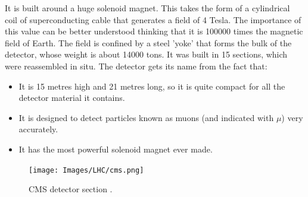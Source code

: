 It is built around a huge solenoid magnet. This takes the form of a cylindrical coil of superconducting cable that generates a field of 4 Tesla. The importance of this value can be better understood thinking that it is 100000 times the magnetic field of Earth. The field is confined by a steel 'yoke' that forms the bulk of the detector, whose weight is about 14000 tons. It was built in 15 sections, which were reassembled in situ. The detector gets its name from the fact that:
\begin{itemize}
	\item It is 15 metres high and 21 metres long, so it is quite compact for all the detector material it contains.
	\item It is designed to detect particles known as muons (and indicated with $\mu$) very accurately.
	\item It has the most powerful solenoid magnet ever made.
\end{itemize}

\begin{figure}[t]
	\begin{center}
		\texttt{[image: Images/LHC/cms.png]}
		\caption{CMS detector section \cite{cms}.}
		\label{fig:CMS_SECTION}
	\end{center}
\end{figure}

